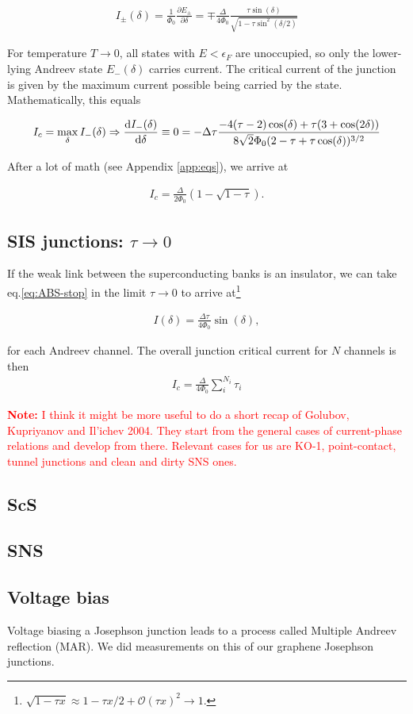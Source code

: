 \begin{eqnarray}
I_{\pm}(\delta)=\frac{1}{\Phi_0}\frac{\partial E_{\pm}}{\partial\delta}=\mp\frac{\Delta}{4\Phi_0}\frac{\tau\sin(\delta)}{\sqrt{1-\tau\sin^2(\delta/2)}}
\label{eq:CPR-full}
\end{eqnarray}

For temperature $T\rightarrow0$, all states with $E<\epsilon_F$ are unoccupied, so only the lower-lying Andreev state $E_{-}(\delta)$ carries current. The critical current of the junction is given by the maximum current possible being carried by the state. Mathematically, this equals

\begin{eqnarray}
I_c=\max_\delta I_{-}(\delta) \Rightarrow \frac{{\rm d}I_{-}(\delta)}{{\rm d}\delta}\equiv0=-\Delta\tau\frac{-4(\tau-2)\cos(\delta)+\tau(3+\cos(2\delta))}{8\sqrt{2}\Phi_0(2-\tau+\tau\cos(\delta))^{3/2}}
\label{eq:ABS-start}
\end{eqnarray}

After a lot of math (see Appendix \ref{app:eqs}), we arrive at

\begin{eqnarray}
I_c = \frac{\Delta}{2\Phi_0}\left( 1-\sqrt{1-\tau} \right).
\label{eq:ABS-stop}
\end{eqnarray}

\subsection{SIS junctions: $\tau \rightarrow 0$}
If the weak link between the superconducting banks is an insulator, we can take eq.\ref{eq:ABS-stop} in the limit $\tau \rightarrow 0$ to arrive at\footnote{$\sqrt{1-\tau x}\approx 1-\tau x/2+\mathcal{O}(\tau x)^2\rightarrow 1$.}

\begin{eqnarray}
I(\delta)=\frac{\Delta\tau}{4\Phi_0}\sin(\delta),
\end{eqnarray}

for each Andreev channel. The overall junction critical current for $N$ channels is then 
\begin{eqnarray}
	I_c=\frac{\Delta}{4\Phi_0}\sum_{i}^{N_i}\tau_i
\end{eqnarray}

\textcolor{red}{\textbf{Note:} I think it might be more useful to do a short recap of Golubov, Kupriyanov and Il'ichev 2004. They start from the general cases of current-phase relations and develop from there. Relevant cases for us are KO-1, point-contact, tunnel junctions and clean and dirty SNS ones.}

\subsection{ScS}



\subsection{SNS}

\subsection{Voltage bias}
Voltage biasing a Josephson junction leads to a process called Multiple Andreev reflection (MAR).
We did measurements on this of our graphene Josephson junctions.